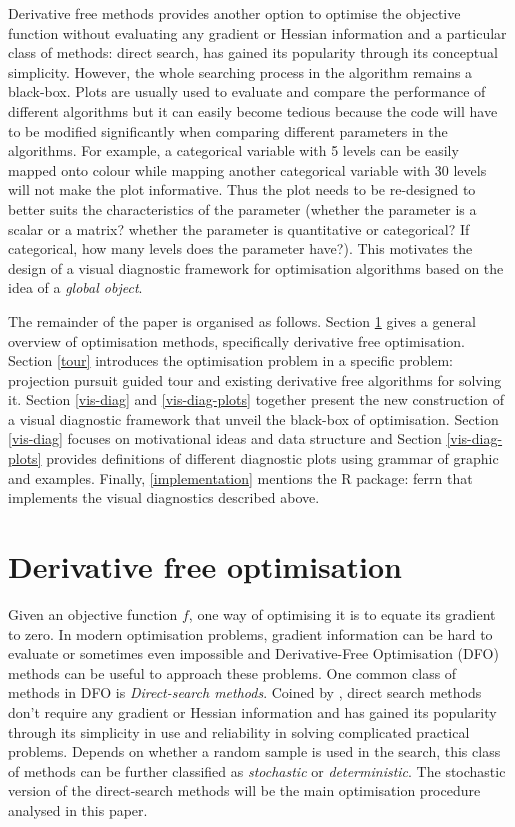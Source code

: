 \documentclass[12pt]{article}
\begin{document}
Derivative free methods provides another option to optimise the
objective function without evaluating any gradient or Hessian
information and a particular class of methods: direct search, has gained
its popularity through its conceptual simplicity. However, the whole
searching process in the algorithm remains a black-box. Plots are
usually used to evaluate and compare the performance of different
algorithms but it can easily become tedious because the code will have
to be modified significantly when comparing different parameters in the
algorithms. For example, a categorical variable with 5 levels can be
easily mapped onto colour while mapping another categorical variable
with 30 levels will not make the plot informative. Thus the plot needs
to be re-designed to better suits the characteristics of the parameter
(whether the parameter is a scalar or a matrix? whether the parameter is
quantitative or categorical? If categorical, how many levels does the
parameter have?). This motivates the design of a visual diagnostic
framework for optimisation algorithms based on the idea of a
\emph{global object}.

The remainder of the paper is organised as follows. Section \ref{DFO}
gives a general overview of optimisation methods, specifically
derivative free optimisation. Section \ref{tour} introduces the
optimisation problem in a specific problem: projection pursuit guided
tour and existing derivative free algorithms for solving it. Section
\ref{vis-diag} and \ref{vis-diag-plots} together present the new
construction of a visual diagnostic framework that unveil the black-box
of optimisation. Section \ref{vis-diag} focuses on motivational ideas
and data structure and Section \ref{vis-diag-plots} provides definitions
of different diagnostic plots using grammar of graphic and examples.
Finally, \ref{implementation} mentions the R package: ferrn that
implements the visual diagnostics described above.

\hypertarget{DFO}{%
\section{Derivative free optimisation}\label{DFO}}

Given an objective function \(f\), one way of optimising it is to equate
its gradient to zero. In modern optimisation problems, gradient
information can be hard to evaluate or sometimes even impossible and
Derivative-Free Optimisation (DFO) methods can be useful to approach
these problems. One common class of methods in DFO is
\emph{Direct-search methods}. Coined by \citet{hooke1961direct}, direct
search methods don't require any gradient or Hessian information and has
gained its popularity through its simplicity in use and reliability in
solving complicated practical problems. Depends on whether a random
sample is used in the search, this class of methods can be further
classified as \emph{stochastic} or \emph{deterministic}. The stochastic
version of the direct-search methods will be the main optimisation
procedure analysed in this paper.
\end{document}
